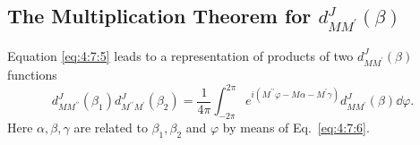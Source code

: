 \subsection{The Multiplication Theorem for $d_{M M^{\prime}}^{J}(\beta)$}\label{sec:4.7.4}
Equation \eqref{eq:4:7:5} leads to a representation of products of two $d_{M M^{\prime}}^{J}(\beta)$ functions
\begin{equation}
d_{M M^{\prime \prime}}^{J}\left(\beta_{1}\right) d_{M^{\prime \prime} M^{\prime}}^{J}\left(\beta_{2}\right)=\frac{1}{4 \pi} \int_{-2 \pi}^{2 \pi} e^{i\left(M^{\prime \prime} \varphi-M \alpha-M^{\prime} \gamma\right)} d_{M M^{\prime}}^{J}(\beta) \dd \varphi .\label{eq:4:7:16}
\end{equation}
Here $\alpha, \beta, \gamma$ are related to $\beta_{1}, \beta_{2}$ and $\varphi$ by means of Eq.~\eqref{eq:4:7:6}.

